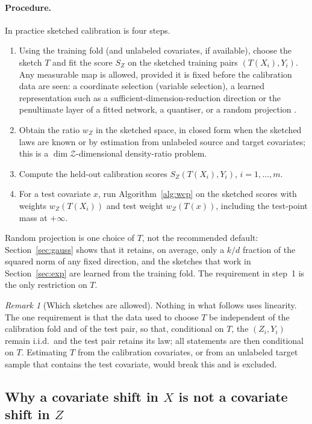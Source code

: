\documentclass[11pt,a4paper]{article}
\newcommand{\Zc}{\mathcal Z}
\theoremstyle{plain}
\theoremstyle{definition}
\theoremstyle{remark}
\newtheorem{remark}[theorem]{Remark}
\begin{document}
\paragraph{Procedure.} In practice sketched calibration is four steps.
\begin{enumerate}[leftmargin=1.8em,itemsep=1pt]
\item Using the training fold (and unlabeled covariates, if available), choose the sketch $T$ and fit the score $S_Z$ on the sketched training pairs $(T(X_i),Y_i)$. Any measurable map is allowed, provided it is fixed before the calibration data are seen: a coordinate selection (variable selection), a learned representation such as a sufficient-dimension-reduction direction \cite{li1991,cook1998,stojanov2019} or the penultimate layer of a fitted network, a quantiser, or a random projection \cite{jl1984}.
\item Obtain the ratio $w_Z$ in the sketched space, in closed form when the sketched laws are known or by estimation from unlabeled source and target covariates; this is a $\dim\Zc$-dimensional density-ratio problem.
\item Compute the held-out calibration scores $S_Z(T(X_i),Y_i)$, $i=1,\dots,m$.
\item For a test covariate $x$, run Algorithm~\ref{alg:wcp} on the sketched scores with weights $w_Z(T(X_i))$ and test weight $w_Z(T(x))$, including the test-point mass at $+\infty$.
\end{enumerate}
Random projection is one choice of $T$, not the recommended default: Section~\ref{sec:gauss} shows that it retains, on average, only a $k/d$ fraction of the squared norm of any fixed direction, and the sketches that work in Section~\ref{sec:exp} are learned from the training fold. The requirement in step~1 is the only restriction on $T$.

\begin{remark}[Which sketches are allowed]\label{rem:allowed}
Nothing in what follows uses linearity. The one requirement is that the data used to choose $T$ be independent of the calibration fold and of the test pair, so that, conditional on $T$, the $(Z_i,Y_i)$ remain i.i.d.\ and the test pair retains its law; all statements are then conditional on $T$. Estimating $T$ from the calibration covariates, or from an unlabeled target sample that contains the test covariate, would break this and is excluded.
\end{remark}
\subsection{Why a covariate shift in $X$ is not a covariate shift in $Z$}
\end{document}
